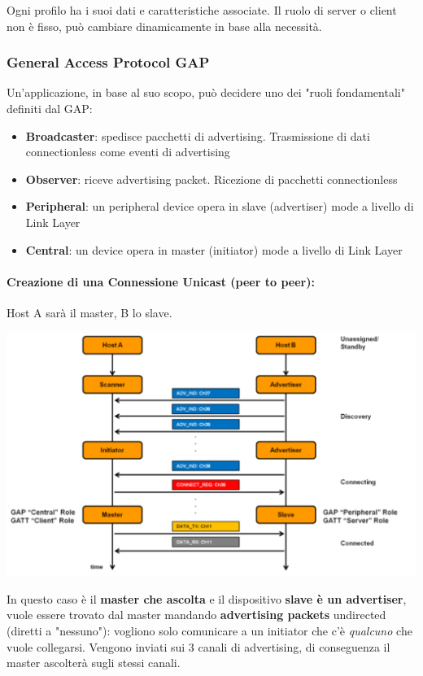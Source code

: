 Ogni profilo ha i suoi dati e caratteristiche associate. Il ruolo di server o client non è fisso, può cambiare dinamicamente in base alla necessità.

\subsubsection{General Access Protocol GAP}

Un'applicazione, in base al suo scopo, può decidere uno dei "ruoli fondamentali" definiti dal GAP:
\begin{itemize}
	\item \textbf{Broadcaster}: spedisce pacchetti di advertising. Trasmissione di dati connectionless come eventi di advertising

	\item \textbf{Observer}: riceve advertising packet. Ricezione di pacchetti connectionless

	\item \textbf{Peripheral}: un peripheral device opera in slave (advertiser) mode a livello di Link Layer

	\item \textbf{Central}: un device opera in master (initiator) mode a livello di Link Layer
\end{itemize}

\paragraph{Creazione di una Connessione Unicast (peer to peer):} Host A sarà il master, B lo slave.
\begin{center}
	\includegraphics[width=0.99\linewidth]{img/wpan/bleunicast}
\end{center}
In questo caso è il \textbf{master che ascolta} e il dispositivo \textbf{slave è un advertiser}, vuole essere trovato dal master mandando \textbf{advertising packets} undirected (diretti a "nessuno"): vogliono solo comunicare a un initiator che c'è \textit{qualcuno} che vuole collegarsi. Vengono inviati sui 3 canali di advertising, di conseguenza il master ascolterà sugli stessi canali.


